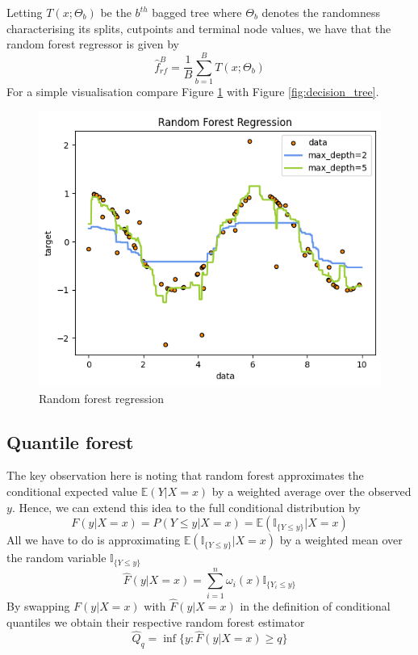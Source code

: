 Letting $T(x;\Theta_b)$ be the $b^{th}$ bagged tree where $\Theta_b$ denotes the randomness characterising its splits, cutpoints and terminal node values, we have that the random forest regressor is given by
\begin{equation}
    \hat{f}_{rf}^{B}=\frac{1}{B}\sum\limits_{b=1}^{B}T(x;\Theta_b)
\end{equation}
For a simple visualisation compare Figure \ref{fig:random_forest} with Figure \ref{fig:decision_tree}.
\begin{figure}
    \includegraphics[width=\textwidth]{images/random_forest.png}
    \caption{Random forest regression}
    \label{fig:random_forest}
\end{figure}


\subsection{Quantile forest}
The key observation here is noting that random forest approximates the conditional expected value $\mathbb{E}(Y|X=x)$ by a weighted average over the observed $y$.
Hence, we can extend this idea to the full conditional distribution by
\begin{equation}
    F(y|X=x)=P(Y\leq y|X=x)=\mathbb{E}(\mathbb{I}_{\{Y\leq y\}}|X=x)
\end{equation}
All we have to do is approximating $\mathbb{E}(\mathbb{I}_{\{Y\leq y\}}|X=x)$ by a weighted mean over the random variable $\mathbb{I}_{\{Y\leq y\}}$
\begin{equation}
    \hat{F}(y|X=x)=\sum\limits_{i=1}^{n}\omega_i(x)\mathbb{I}_{\{Y_i\leq y\}}
\end{equation}
By swapping $F(y|X=x)$ with $\hat{F}(y|X=x)$ in the definition of conditional quantiles we obtain their respective random forest estimator
\begin{equation}
    \hat{Q}_q=\inf\{y:\hat{F}(y|X=x)\geq q\}
\end{equation}


